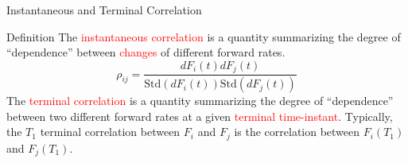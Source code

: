 \documentclass{beamer}
\begin{document}
\begin{frame}{Instantaneous and Terminal Correlation}
	
	\begin{block}{Definition}
		The \textcolor{red}{instantaneous correlation} is a quantity summarizing the degree of “dependence” between \textcolor{red}{changes} of different forward rates.
		\begin{equation*}
			\rho_{ij} = \frac{dF_i(t) dF_j(t)}{\text{Std}(dF_i(t))\text{Std}(dF_j(t))}
		\end{equation*}
		The \textcolor{red}{terminal correlation} is a quantity summarizing the degree of “dependence” between two different forward rates at a given  \textcolor{red}{terminal time-instant}. Typically, the $T_1$ terminal correlation between $F_i$ and $F_j$ is the correlation between $F_i(T_1)$ and $F_j(T_1)$.
	\end{block}
\end{frame}
\end{document}
